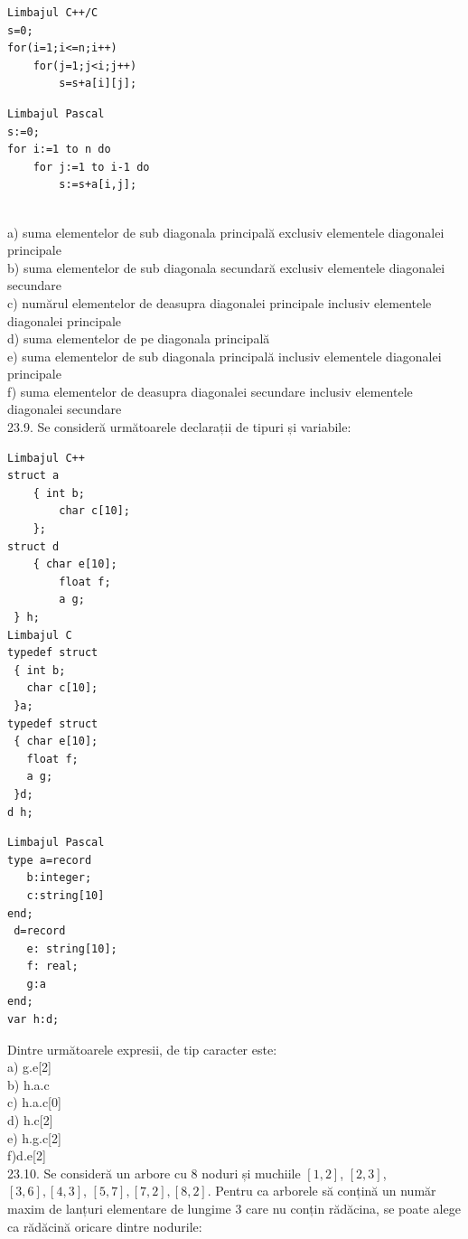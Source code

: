 {{\begin{verbatim}
Limbajul C++/C
s=0;
for(i=1;i<=n;i++)
    for(j=1;j<i;j++)
        s=s+a[i][j];
\end{verbatim}
\begin{verbatim}
Limbajul Pascal
s:=0;
for i:=1 to n do
    for j:=1 to i-1 do
        s:=s+a[i,j];
\end{verbatim}
\\
a) suma elementelor de sub diagonala principală exclusiv elementele diagonalei principale
\\
b) suma elementelor de sub diagonala secundară exclusiv elementele diagonalei secundare
\\
c) numărul elementelor de deasupra diagonalei principale inclusiv elementele diagonalei principale
\\
d) suma elementelor de pe diagonala principală
\\
e) suma elementelor de sub diagonala principală inclusiv elementele diagonalei principale
\\
f) suma elementelor de deasupra diagonalei secundare inclusiv elementele diagonalei secundare
\\
23.9. Se consideră următoarele declarații de tipuri și variabile:
\begin{verbatim}
Limbajul C++
struct a
    { int b;
        char c[10];
    };
struct d
    { char e[10];
        float f;
        a g;
 } h; 
Limbajul C 
typedef struct   
 { int b;  
   char c[10]; 
 }a; 
typedef struct  
 { char e[10];  
   float f;  
   a g; 
 }d; 
d h;
\end{verbatim}
\begin{verbatim}
Limbajul Pascal 
type a=record  
   b:integer; 
   c:string[10]  
end; 
 d=record  
   e: string[10];  
   f: real;  
   g:a   
end; 
var h:d;
\end{verbatim}
Dintre următoarele expresii, de tip caracter este:
\\
a) g.e[2]
\\
b) h.a.c
\\
c) h.a.c[0]
\\
d) h.c[2]
\\
e) h.g.c[2]
\\
f)d.e[2]
\\
23.10. Se consideră un arbore cu 8 noduri și muchiile $[1,2]$, $[2,3]$, $[3,6],[4,3]$, $[5,7],[7,2],[8,2]$. Pentru ca arborele să conțină un număr maxim de lanțuri elementare de lungime 3 care nu conțin rădăcina, se poate alege ca rădăcină oricare dintre nodurile:
\\
}}
